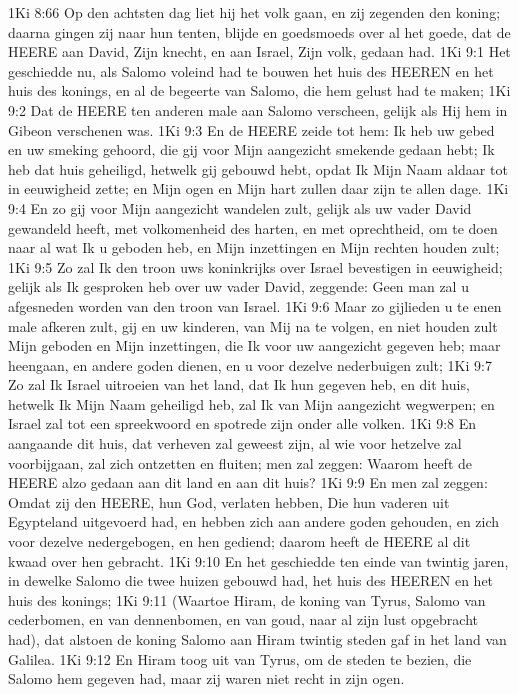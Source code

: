 1Ki 8:66  Op den achtsten dag liet hij het volk gaan, en zij zegenden den koning; daarna gingen zij naar hun tenten, blijde en goedsmoeds over al het goede, dat de HEERE aan David, Zijn knecht, en aan Israel, Zijn volk, gedaan had.
1Ki 9:1  Het geschiedde nu, als Salomo voleind had te bouwen het huis des HEEREN en het huis des konings, en al de begeerte van Salomo, die hem gelust had te maken;
1Ki 9:2  Dat de HEERE ten anderen male aan Salomo verscheen, gelijk als Hij hem in Gibeon verschenen was.
1Ki 9:3  En de HEERE zeide tot hem: Ik heb uw gebed en uw smeking gehoord, die gij voor Mijn aangezicht smekende gedaan hebt; Ik heb dat huis geheiligd, hetwelk gij gebouwd hebt, opdat Ik Mijn Naam aldaar tot in eeuwigheid zette; en Mijn ogen en Mijn hart zullen daar zijn te allen dage.
1Ki 9:4  En zo gij voor Mijn aangezicht wandelen zult, gelijk als uw vader David gewandeld heeft, met volkomenheid des harten, en met oprechtheid, om te doen naar al wat Ik u geboden heb, en Mijn inzettingen en Mijn rechten houden zult;
1Ki 9:5  Zo zal Ik den troon uws koninkrijks over Israel bevestigen in eeuwigheid; gelijk als Ik gesproken heb over uw vader David, zeggende: Geen man zal u afgesneden worden van den troon van Israel.
1Ki 9:6  Maar zo gijlieden u te enen male afkeren zult, gij en uw kinderen, van Mij na te volgen, en niet houden zult Mijn geboden en Mijn inzettingen, die Ik voor uw aangezicht gegeven heb; maar heengaan, en andere goden dienen, en u voor dezelve nederbuigen zult;
1Ki 9:7  Zo zal Ik Israel uitroeien van het land, dat Ik hun gegeven heb, en dit huis, hetwelk Ik Mijn Naam geheiligd heb, zal Ik van Mijn aangezicht wegwerpen; en Israel zal tot een spreekwoord en spotrede zijn onder alle volken.
1Ki 9:8  En aangaande dit huis, dat verheven zal geweest zijn, al wie voor hetzelve zal voorbijgaan, zal zich ontzetten en fluiten; men zal zeggen: Waarom heeft de HEERE alzo gedaan aan dit land en aan dit huis?
1Ki 9:9  En men zal zeggen: Omdat zij den HEERE, hun God, verlaten hebben, Die hun vaderen uit Egypteland uitgevoerd had, en hebben zich aan andere goden gehouden, en zich voor dezelve nedergebogen, en hen gediend; daarom heeft de HEERE al dit kwaad over hen gebracht.
1Ki 9:10  En het geschiedde ten einde van twintig jaren, in dewelke Salomo die twee huizen gebouwd had, het huis des HEEREN en het huis des konings;
1Ki 9:11  (Waartoe Hiram, de koning van Tyrus, Salomo van cederbomen, en van dennenbomen, en van goud, naar al zijn lust opgebracht had), dat alstoen de koning Salomo aan Hiram twintig steden gaf in het land van Galilea.
1Ki 9:12  En Hiram toog uit van Tyrus, om de steden te bezien, die Salomo hem gegeven had, maar zij waren niet recht in zijn ogen.
